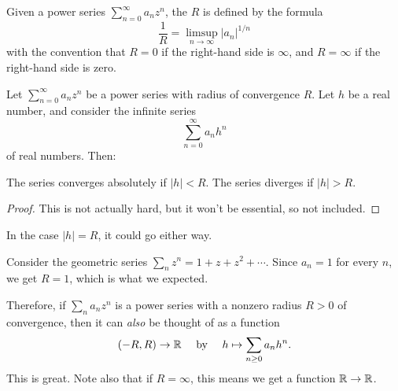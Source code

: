 \begin{definition}
	Given a power series $\sum_{n=0}^{\infty} a_n z^n$,
	the  $R$ is defined
	by the formula
	\[ \frac 1R = \limsup_{n \to \infty} \left\lvert a_n \right\rvert^{1/n} \]
	with the convention that $R = 0$ if the right-hand side is $\infty$,
	and $R = \infty$ if the right-hand side is zero.
\end{definition}
\begin{theorem}
	Let $\sum_{n=0}^{\infty} a_n z^n$ be a power series with radius of convergence $R$.
	Let $h$ be a real number, and consider the infinite series
	\[ \sum_{n=0}^\infty a_n h^n \]
	of real numbers.
	Then:
	\begin{itemize}
		\ii The series converges absolutely if $|h| < R$.
		\ii The series diverges if $|h| > R$.
	\end{itemize}
\end{theorem}
\begin{proof}
	This is not actually hard,
	but it won't be essential, so not included.
\end{proof}
\begin{remark}
	In the case $|h| = R$, it could go either way.
\end{remark}
\begin{example}
	Consider the geometric series $\sum_{n} z^n = 1 + z + z^2 + \cdots$.
	Since $a_n = 1$ for every $n$, we get $R = 1$,
	which is what we expected.
\end{example}

Therefore, if $\sum_n a_n z^n$ is a power
series with a nonzero radius $R > 0$ of convergence,
then it can \emph{also} be thought of as a function
\[ (-R, R) \to \mathbb R
	\quad\text{ by }\quad
	h \mapsto \sum_{n \ge 0} a_n h^n. \]
This is great.
Note also that if $R = \infty$,
this means we get a function $\mathbb R \to \mathbb R$.

